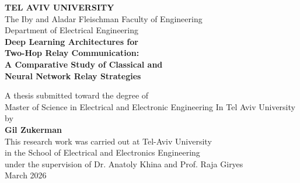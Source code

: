 \documentclass[12pt,a4paper,oneside]{book}
\theoremstyle{definition}
\begin{document}
\begin{titlepage}
\begin{center}
\vspace*{0.5cm}

{\LARGE\textbf{TEL AVIV UNIVERSITY}}\\[6pt]
{\large The Iby and Aladar Fleischman Faculty of Engineering}\\[4pt]
{\large Department of Electrical Engineering}\\[2cm]

{\LARGE\bfseries
Deep Learning Architectures for\\[6pt]
Two-Hop Relay Communication:\\[6pt]
A Comparative Study of Classical and\\[6pt]
Neural Network Relay Strategies\\[2cm]
}

{\large A thesis submitted toward the degree of}\\[4pt]
{\large Master of Science in Electrical and Electronic Engineering \newline In Tel Aviv University}\\[1.5cm]

{\large by}\\[6pt]
{\Large\bfseries Gil Zukerman}\\[1.5cm]
This research work was carried out at Tel-Aviv University\\
in the School of Electrical and Electronics Engineering\\
under the supervision of Dr. Anatoly Khina and Prof. Raja Giryes\\
\vfill
{\large{March 2026}}\\[1.5cm]
\vfill
\end{center}
\end{titlepage}

\frontmatter
{}



\end{document}
